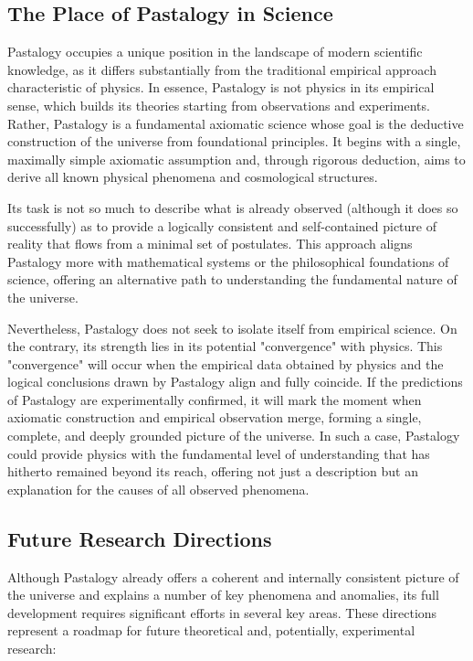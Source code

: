 \documentclass[pdflatex,sn-mathphys-num]{sn-jnl}
\begin{document}
\subsection{The Place of Pastalogy in Science}\label{subsec:place-in-science}

Pastalogy occupies a unique position in the landscape of modern scientific knowledge, as it differs substantially from the traditional empirical approach characteristic of physics. In essence, Pastalogy is not physics in its empirical sense, which builds its theories starting from observations and experiments. Rather, Pastalogy is a fundamental axiomatic science whose goal is the deductive construction of the universe from foundational principles. It begins with a single, maximally simple axiomatic assumption and, through rigorous deduction, aims to derive all known physical phenomena and cosmological structures.

Its task is not so much to describe what is already observed (although it does so successfully) as to provide a logically consistent and self-contained picture of reality that flows from a minimal set of postulates. This approach aligns Pastalogy more with mathematical systems or the philosophical foundations of science, offering an alternative path to understanding the fundamental nature of the universe.

Nevertheless, Pastalogy does not seek to isolate itself from empirical science. On the contrary, its strength lies in its potential "convergence" with physics. This "convergence" will occur when the empirical data obtained by physics and the logical conclusions drawn by Pastalogy align and fully coincide. If the predictions of Pastalogy are experimentally confirmed, it will mark the moment when axiomatic construction and empirical observation merge, forming a single, complete, and deeply grounded picture of the universe. In such a case, Pastalogy could provide physics with the fundamental level of understanding that has hitherto remained beyond its reach, offering not just a description but an explanation for the causes of all observed phenomena.

\subsection{Future Research Directions}\label{subsec:future-directions}

Although Pastalogy already offers a coherent and internally consistent picture of the universe and explains a number of key phenomena and anomalies, its full development requires significant efforts in several key areas. These directions represent a roadmap for future theoretical and, potentially, experimental research:
\end{document}
